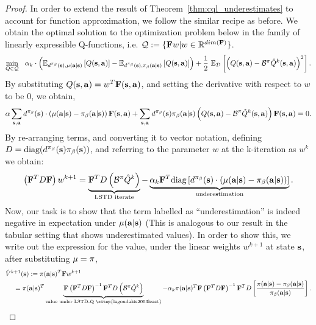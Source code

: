 \begin{proof} 
In order to extend the result of Theorem~\ref{thm:cql_underestimates} to account for function approximation, we follow the similar recipe as before. We obtain the optimal solution to the optimization problem below in the family of linearly expressible Q-functions, i.e. $\mathcal{Q} := \{\mathbf{F} w | w \in \mathbb{R}^{dim(\mathbf{F})} \}$. 
\begin{equation*}
    \min_{Q \in \mathcal{Q}}~~ \alpha_k \cdot \left(\mathbb{E}_{d^{\pi_\beta}(\mathbf{s}),\mu(\mathbf{a}|\mathbf{s})}\left[Q(\mathbf{s}, \mathbf{a})\right] - {\mathbb{E}_{d^{\pi_\beta}(\mathbf{s}),{\pi_\beta}(\mathbf{a}|\mathbf{s})}\left[Q(\mathbf{s}, \mathbf{a})\right]} \right) + \frac{1}{2}~ \mathbb{E}_{\mathcal{D}}\left[\left(Q(\mathbf{s}, \mathbf{a}) - \mathcal{B}^\pi \hat{Q}^{k} (\mathbf{s}, \mathbf{a}) \right)^2 \right].
\end{equation*}
By substituting $Q(\mathbf{s}, \mathbf{a}) = w^T \mathbf{F}(\mathbf{s}, \mathbf{a})$, and setting the derivative with respect to $w$ to be 0, we obtain,
\begin{align*}
    \alpha \sum_{\mathbf{s}, \mathbf{a}} d^{\pi_\beta}(\mathbf{s}) \cdot \left( \mu(\mathbf{a}|\mathbf{s}) - {\pi_\beta}(\mathbf{a}|\mathbf{s}) \right) \mathbf{F}(\mathbf{s}, \mathbf{a}) + \sum_{\mathbf{s}, \mathbf{a}} d^{\pi_\beta}(\mathbf{s}) {\pi_\beta}(\mathbf{a}|\mathbf{s}) \left( Q(\mathbf{s}, \mathbf{a}) - \mathcal{B}^\pi \hat{Q}^k(\mathbf{s}, \mathbf{a}) \right) \mathbf{F}(\mathbf{s}, \mathbf{a}) = 0.
\end{align*}
By re-arranging terms, and converting it to vector notation, defining $D = \text{diag}(d^{\pi_\beta}(\mathbf{s}){\pi_\beta}(\mathbf{s}))$, and referring to the parameter $w$ at the k-iteration as $w^k$ we obtain:
\begin{align*}
    \left(\mathbf{F}^T D \mathbf{F} \right) w^{k+1} = \underbrace{\mathbf{F}^T D \left( \mathcal{B}^\pi \hat{Q}^k \right)}_{\text{LSTD iterate}} - \underbrace{\alpha_k \mathbf{F}^T \text{diag}\left[d^{\pi_\beta}(\mathbf{s}) \cdot(\mu(\mathbf{a}|\mathbf{s}) - {\pi_\beta}(\mathbf{a}|\mathbf{s})) \right]}_{\text{underestimation}}.
\end{align*}
Now, our task is to show that the term labelled as ``underestimation'' is indeed negative in expectation under $\mu(\mathbf{a}|\mathbf{s})$ (This is analogous to our result in the tabular setting that shows underestimated values). In order to show this, we write out the expression for the value, under the linear weights $w^{k+1}$ at state $\mathbf{s}$, after substituting $\mu = \pi$,
\begin{align}
    \hat{V}^{k+1}(\bs) &:= \policy(\ba|\bs)^T \Qfeat w^{k+1}\\
    = \policy(&\ba|\bs)^T \underbrace{\Qfeat \left(\Qfeat^T D \Qfeat \right)^{-1} \Qfeat^T D \left(\bellman^\policy \hat{Q}^k \right)}_{\text{value under LSTD-Q~\citep{lagoudakis2003least}}} - \alpha_k \policy(\ba|\bs)^T \Qfeat \left(\Qfeat^T D \Qfeat \right)^{-1} \Qfeat^T D \left[\frac{\policy(\ba|\bs) - \behavior(\ba|\bs)}{\behavior(\ba|\bs)} \right].

\end{align}
\end{proof}
